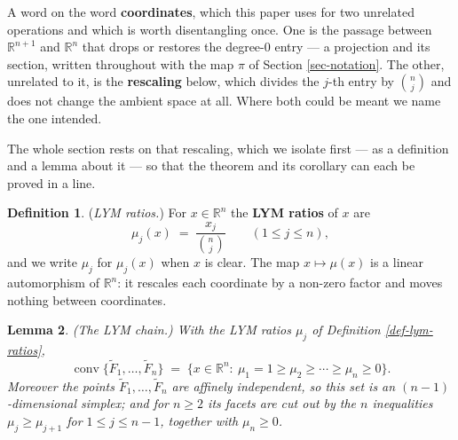 \documentclass[11pt, a4paper, abstract=yes]{scrartcl}
\theoremstyle{definition}
\newtheorem{definition}{Definition}
\theoremstyle{remark}
\theoremstyle{plain}
\newtheorem{lemma}[definition]{Lemma}
\newcommand{\proj}{\pi}
\newcommand{\leanpartial}{\tikz[baseline=-0.6ex]{\fill[leanfull] (0,-0.6ex) arc (-90:90:0.6ex) -- cycle;\draw[leanfull,line width=0.5pt] (0,0) circle (0.6ex);}}
\newcommand{\leanmark}[1]{\leavevmode{\reversemarginpar\marginnote{\raggedleft#1}}}
\newcommand{\conv}{\operatorname{conv}}
\begin{document}
A word on the word \textbf{coordinates}, which this paper uses for two unrelated operations and which is
worth disentangling once. One is the passage between \(\mathbb R^{n+1}\) and \(\mathbb R^n\) that
drops or restores the degree-\(0\) entry --- a projection and its section, written throughout with
the map \(\proj\) of Section \ref{sec-notation}. The other, unrelated to it, is the \textbf{rescaling} below, which
divides the \(j\)-th entry by \(\binom nj\) and does not change the ambient space at all. Where
both could be meant we name the one intended.

The whole section rests on that rescaling, which we isolate first --- as a definition and a lemma
about it --- so that the theorem and its corollary can each be proved in a line.

\begin{definition}
(\emph{LYM ratios.}) For \(x\in\mathbb R^n\) the \textbf{LYM ratios} of \(x\) are
\begin{equation}\label{eq:lym-ratios}
  \mu_j(x)\;=\;\frac{x_j}{\binom nj}\qquad(1\le j\le n),
\end{equation}
and we write \(\mu_j\) for \(\mu_j(x)\) when \(x\) is clear. The map \(x\mapsto\mu(x)\) is a
linear automorphism of \(\mathbb R^n\): it rescales each coordinate by a non-zero factor and moves
nothing between coordinates.
\label{def:lym-ratios}
\label{def-lym-ratios}
\end{definition}

\begin{lemma}
\leanmark{\leanpartial}(\emph{The LYM chain.}) With the LYM ratios \(\mu_j\) of Definition \ref{def-lym-ratios},
\begin{equation}\label{eq:mu}
  \conv\lbrace\tilde F_1,\dots,\tilde F_n\rbrace
  \;=\;\lbrace x\in\mathbb R^n:\ \mu_1=1\ge\mu_2\ge\cdots\ge\mu_n\ge0\rbrace .
\end{equation}
Moreover the points \(\tilde F_1,\dots,\tilde F_n\) are affinely independent, so this set is an
\((n-1)\)-dimensional simplex; and for \(n\ge2\) its facets are cut out by the \(n\) inequalities
\(\mu_j\ge\mu_{j+1}\) for \(1\le j\le n-1\), together with \(\mu_n\ge0\).
\label{lem:mu}
\label{lem-mu}
\end{lemma}
\end{document}
